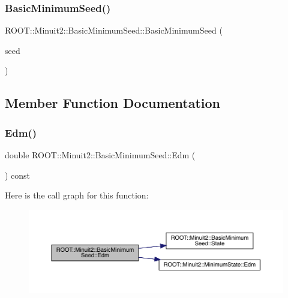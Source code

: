 \subsubsection{\texorpdfstring{BasicMinimumSeed()}{BasicMinimumSeed()}\hspace{0.1cm}{\footnotesize\ttfamily [6/6]}}
{\footnotesize\ttfamily R\+O\+O\+T\+::\+Minuit2\+::\+Basic\+Minimum\+Seed\+::\+Basic\+Minimum\+Seed (\begin{DoxyParamCaption}\item[{const \mbox{\hyperlink{classROOT_1_1Minuit2_1_1BasicMinimumSeed}{Basic\+Minimum\+Seed}} \&}]{seed }\end{DoxyParamCaption})\hspace{0.3cm}{\ttfamily [inline]}}



\subsection{Member Function Documentation}
\mbox{\label{classROOT_1_1Minuit2_1_1BasicMinimumSeed_a10659878d070bed73df23682eab3e88e}} 
\subsubsection{\texorpdfstring{Edm()}{Edm()}\hspace{0.1cm}{\footnotesize\ttfamily [1/3]}}
{\footnotesize\ttfamily double R\+O\+O\+T\+::\+Minuit2\+::\+Basic\+Minimum\+Seed\+::\+Edm (\begin{DoxyParamCaption}{ }\end{DoxyParamCaption}) const\hspace{0.3cm}{\ttfamily [inline]}}

Here is the call graph for this function\+:
\nopagebreak
\begin{figure}[H]
\begin{center}
\leavevmode
\includegraphics[width=350pt]{de/d50/classROOT_1_1Minuit2_1_1BasicMinimumSeed_a10659878d070bed73df23682eab3e88e_cgraph}
\end{center}
\end{figure}
\mbox{\label{classROOT_1_1Minuit2_1_1BasicMinimumSeed_a10659878d070bed73df23682eab3e88e}} 
